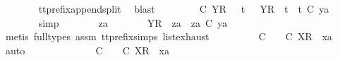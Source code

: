 \begin{isabellebody}
\ \ \ \ \ \ \isamarkupfalse%
\ tt{\isacharunderscore}prefix{\isacharunderscore}append{\isacharunderscore}split\ \isamarkupfalse%
\ blast\isanewline
\ \ \ \ \isamarkupfalse%
\ \isamarkupfalse%
\ {\isachardoublequoteopen}{\isasymsigma}{\isacharprime}\ {\isasymle}\isactrlsub C\ {\isacharbrackleft}{\isacharbrackleft}Y{\isacharbrackright}\isactrlsub R{\isacharbrackright}\ \ {\isasymor}\ {\isacharparenleft}{\isasymexists}t{\isacharprime}{\isachardot}\ {\isasymsigma}{\isacharprime}\ {\isacharequal}\ {\isacharbrackleft}Y{\isacharbrackright}\isactrlsub R\ {\isacharhash}\ t{\isacharprime}\ {\isasymand}\ t{\isacharprime}\ {\isasymle}\isactrlsub C\ ya{\isacharparenright}{\isachardoublequoteclose}\isanewline
\ \ \ \ \ \ \isamarkupfalse%
\ simp\isanewline
\ \ \ \ \isamarkupfalse%
\ \isamarkupfalse%
\ za\ \ {\isachardoublequoteopen}{\isasymsigma}{\isacharprime}\ {\isacharequal}\ {\isacharbrackleft}{\isacharbrackright}\ {\isasymor}\ {\isacharparenleft}{\isasymsigma}{\isacharprime}\ {\isacharequal}\ {\isacharbrackleft}Y{\isacharbrackright}\isactrlsub R\ {\isacharhash}\ za\ {\isasymand}\ za\ {\isasymle}\isactrlsub C\ ya{\isacharparenright}{\isachardoublequoteclose}\isanewline
\ \ \ \ \ \ \isamarkupfalse%
\ {\isacharparenleft}metis\ {\isacharparenleft}full{\isacharunderscore}types{\isacharparenright}\ assm{}\ tt{\isacharunderscore}prefix{\isachardot}simps{\isacharparenleft}{}{\isacharparenright}\ list{\isachardot}exhaust{\isacharparenright}\isanewline
\ \ \ \ \isamarkupfalse%
\ \isamarkupfalse%
\ {\isachardoublequoteopen}{\isasymexists}{\isasymrho}{\isacharprime}{\isachardot}\ {\isasymrho}{\isacharprime}\ {\isasymsubseteq}\isactrlsub C\ {\isasymsigma}{\isacharprime}\ {\isasymand}\ {\isasymrho}{\isacharprime}\ {\isasymle}\isactrlsub C\ {\isacharbrackleft}X{\isacharbrackright}\isactrlsub R\ {\isacharhash}\ xa{\isachardoublequoteclose}\isanewline
\ \ \ \ \isamarkupfalse%
\ auto\isanewline
\ \ \ \ \ \ \isamarkupfalse%
\ {\isachardoublequoteopen}{\isasymsigma}{\isacharprime}\ {\isacharequal}\ {\isacharbrackleft}{\isacharbrackright}\ {\isasymLongrightarrow}\ {\isasymexists}{\isasymrho}{\isacharprime}{\isachardot}\ {\isasymrho}{\isacharprime}\ {\isasymsubseteq}\isactrlsub C\ {\isacharbrackleft}{\isacharbrackright}\ {\isasymand}\ {\isasymrho}{\isacharprime}\ {\isasymle}\isactrlsub C\ {\isacharbrackleft}X{\isacharbrackright}\isactrlsub R\ {\isacharhash}\ xa{\isachardoublequoteclose}\isanewline

\end{isabellebody}
